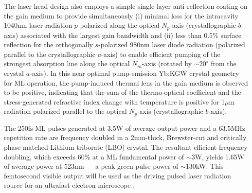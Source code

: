 The laser head design also employs a simple single layer  anti-reflection coating on the gain medium to provide simultaneously (i) minimal loss for the intracavity 1040nm laser radiation $p$-polarized along the optical $N_p$-axis (crystallographic $b$-axis) associated with the largest gain bandwidth and (ii) less than 0.5\% surface reflection for the orthogonally $s$-polarized 980nm laser diode radiation (polarized parallel to the crystallographic $a$-axis) to enable efficient pumping of the strongest absorption line along the optical $N_m$-axis (rotated by $\sim20^\circ$ from the crystal $a$-axis).
In this near optimal pump-emission Yb:KGW crystal geometry for ML operation, the pump-induced thermal lens in the gain medium is observed to be positive, indicating that the sum of the thermo-optical coefficient and the stress-generated refractive index change with temperature is positive for 1$\mu$m radiation polarized parallel to the optical $N_p$-axis (crystallographic $b$-axis).

The 250fs ML pulses generated at 3.5W of average output power and a 63.5MHz repetition rate are frequency doubled in a 2mm-thick, Brewster-cut and critically phase-matched Lithium triborate (LBO) crystal.
The resultant efficient frequency doubling, which exceeds 60\% at a ML fundamental power of $\sim$3W, yields 1.65W of average power at 523nm ---
a peak green pulse power of $\sim$130kW.
This femtosecond visible output will be used as the driving pulsed laser radiation source for an ultrafast electron microscope \cite{king_ultrafast_2005}.

